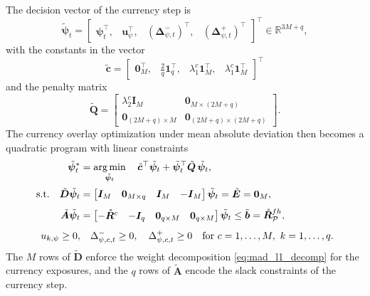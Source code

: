The decision vector of the currency step is
\begin{equation*}
    \tilde{\bm{\psi}}_t = \begin{bmatrix} \bm{\psi}_t^\top,& \bm{u}_\psi^\top,& (\bm{\Delta}_{\psi,t}^-)^\top,&
    (\bm{\Delta}_{\psi,t}^+)^\top \end{bmatrix}^\top \in \mathbb{R}^{3M+q},
\end{equation*}
with the constants in the vector
\begin{equation*}
    \tilde{\bm{c}} = \begin{bmatrix} \bm{0}_M^\top,& \tfrac{2}{q} \bm{1}_q^\top,& \lambda_1^c \bm{1}_M^\top,&
    \lambda_1^c \bm{1}_M^\top \end{bmatrix}^\top
\end{equation*}
and the penalty matrix
\begin{equation*}
    \tilde{\bm{Q}} =
    \begin{bmatrix}
        \lambda_2^c \bm{I}_M & \bm{0}_{M \times (2M+q)} \\
        \bm{0}_{(2M+q) \times M} & \bm{0}_{(2M+q) \times (2M+q)}
    \end{bmatrix}.
\end{equation*}
The currency overlay optimization under mean absolute deviation then becomes a quadratic program with linear
constraints
\begin{equation}
\begin{aligned}
    \tilde{\bm{\psi}}_t^* &= \operatorname*{arg\,min}_{\tilde{\bm{\psi}}_t} \quad
     \tilde{\bm{c}}^\top \tilde{\bm{\psi}}_t + \tilde{\bm{\psi}}_t^\top \tilde{\bm{Q}}\, \tilde{\bm{\psi}}_t, \\[2pt]
    \text{s.t.} \quad
    \tilde{\bm{D}} \tilde{\bm{\psi}}_t &=
    \begin{bmatrix} \bm{I}_M & \bm{0}_{M \times q} & \bm{I}_M & -\bm{I}_M \end{bmatrix} \tilde{\bm{\psi}}_t
    = \tilde{\bm{E}} = \bm{0}_M, \\[4pt]
    \tilde{\bm{A}} \tilde{\bm{\psi}}_t &=
    \begin{bmatrix} -\mathring{\bm{R}}^c & -\bm{I}_q & \bm{0}_{q \times M} & \bm{0}_{q \times M} \end{bmatrix}
    \tilde{\bm{\psi}}_t \le \tilde{\bm{b}} = \mathring{\bm{R}}^{fh}_{\mathcal{P}}, \\[4pt]
    u_{k,\psi} \ge 0, & \quad \Delta_{\psi,c,t}^- \ge 0,\quad \Delta_{\psi,c,t}^+ \ge 0
    \quad \text{for } c = 1, \dots, M,\ k = 1, \dots, q.
\end{aligned}
\end{equation}
The $M$ rows of $\tilde{\bm{D}}$ enforce the weight decomposition \eqref{eq:mad_l1_decomp} for the currency exposures,
and the $q$ rows of $\tilde{\bm{A}}$ encode the slack constraints of the currency step.

